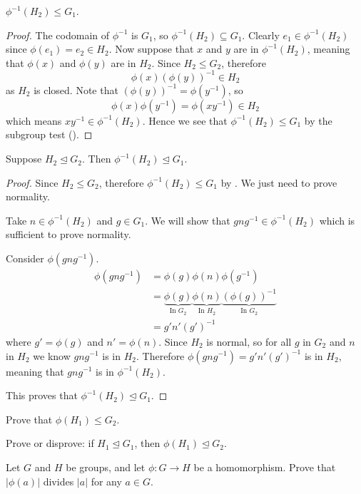 \begin{proposition}\label{prop-homomorphism-inverse-is-subgroup}
    $\phi^{-1}(H_2) \leq G_1$.
\end{proposition}
\begin{proof}
    The codomain of $\phi^{-1}$ is $G_1$, so $\phi^{-1}(H_2) \subseteq G_1$. Clearly $e_1 \in \phi^{-1}(H_2)$ since $\phi(e_1) = e_2 \in H_2$. Now suppose that $x$ and $y$ are in $\phi^{-1}(H_2)$, meaning that $\phi(x)$ and $\phi(y)$ are in $H_2$. Since $H_2 \leq G_2$, therefore
    \[
        \phi(x)\left(\phi(y)\right)^{-1} \in H_2
    \]
    as $H_2$ is closed. Note that $\left(\phi(y)\right)^{-1} = \phi(y^{-1})$, so
    \[
        \phi(x)\phi(y^{-1}) = \phi(xy^{-1}) \in H_2
    \]
    which means $xy^{-1} \in \phi^{-1}(H_2)$. Hence we see that $\phi^{-1}(H_2) \leq G_1$ by the subgroup test ().
\end{proof}

\begin{proposition}
    Suppose $H_2 \unlhd G_2$. Then $\phi^{-1}(H_2) \unlhd G_1$.
\end{proposition}
\begin{proof}
    Since $H_2 \leq G_2$, therefore $\phi^{-1}(H_2) \leq G_1$ by . We just need to prove normality.

    Take $n \in \phi^{-1}(H_2)$ and $g \in G_1$. We will show that $gng^{-1} \in \phi^{-1}(H_2)$ which is sufficient to prove normality.

    Consider $\phi(gng^{-1})$.
    \begin{align*}
        \phi(gng^{-1}) &= \phi(g)\phi(n)\phi(g^{-1}) \\
        &= \underbrace{\phi(g)}_{\text{In }G_2} \underbrace{\phi(n)}_{\text{In }H_2} \underbrace{\left(\phi(g)\right)^{-1}}_{\text{In }G_2}\\
        &= g'n'(g')^{-1}
    \end{align*}
    where $g' = \phi(g)$ and $n' = \phi(n)$. Since $H_2$ is normal, so for all $g$ in $G_2$ and $n$ in $H_2$ we know $gng^{-1}$ is in $H_2$. Therefore $\phi(gng^{-1}) = g'n'(g')^{-1}$ is in $H_2$, meaning that $gng^{-1}$ is in $\phi^{-1}(H_2)$.

    This proves that $\phi^{-1}(H_2) \unlhd G_1$.
\end{proof}

\begin{exercise}\label{exercise-homomorphism-image-is-subgroup}
    Prove that $\phi(H_1) \leq G_2$.
\end{exercise}
\begin{exercise}
    Prove or disprove: if $H_1 \unlhd G_1$, then $\phi(H_1) \unlhd G_2$.
\end{exercise}
\begin{exercise}\label{exercise-order-of-homomorphism-divides-order}
    Let $G$ and $H$ be groups, and let $\phi: G \to H$ be a homomorphism. Prove that $|\phi(a)|$ divides $|a|$ for any $a \in G$.
\end{exercise}

